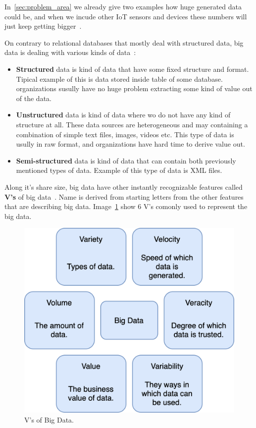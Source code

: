 In~\ref{sec:problem_area} we already give two examples how huge generated data could be, and when we incude other IoT sensors and devices these numbers will just keep getting bigger~\cite{SarigiannidisLR20}.

On contrary to relational databases that mostly deal with structured data, big data is dealing with various kinds of data~\cite{FisherDCD12, Tsai2015, GuoFZ12}:

\begin{itemize}
	\item \textbf{Structured} data is kind of data that have some fixed structure and format. Tipical example of this is data stored inside table of some database. organizations susully have no huge problem extracting some kind of value out of the data.
	\item \textbf{Unstructured} data is kind of data where wo do not have any kind of structure at all. These data sources are heterogeneous and may containing a combination of simple text files, images, videos etc. This type of data is usully in raw format, and organizations have hard time to derive value out.
	\item \textbf{Semi-structured} data is kind of data that can contain both previously mentioned types of data. Example of this type of data is XML files.
\end{itemize}

Along it's share size, big data have other instantly recognizable features called \textbf{V's} of big data~\cite{PatgiriA16}. Name is derived from starting letters from the other features that are describing big data. Image~\ref{fig:fig3} show 6 V's comonly used to represent the big data.

\begin{figure}[H]
	\begin{center}
		\includegraphics[scale=0.7]{images/Figure3.png}
	\end{center}
	\vspace{-0.6cm}
	\caption{V's of Big Data.}
	\label{fig:fig3}
\end{figure}

